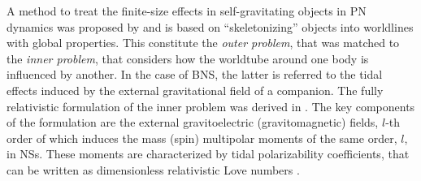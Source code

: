 A method to treat the finite-size effects in self-gravitating objects in \ac{PN} 
dynamics was proposed by \citet{Damour:1983a} and is based on ``skeletonizing'' 
objects into worldlines with global properties. This constitute the \textit{outer problem}, that was matched to the \textit{inner problem}, that considers how the worldtube 
around one body is influenced by another. In the case of \ac{BNS}, the latter is 
referred to the tidal effects induced by the external gravitational field of a companion. 
The fully relativistic formulation of the inner problem was derived in 
\citet{Hinderer:2007mb,Damour:2009vw,Binnington:2009bb}. 
%
%
The key components of the formulation are the external gravitoelectric 
(gravitomagnetic) fields, $l$-th order of which induces the mass (spin) multipolar moments 
of the same order, $l$, in \acp{NS}. These moments are characterized by %
tidal polarizability coefficients, that can be written as dimensionless relativistic 
Love numbers \citep{Damour:2009vw,Binnington:2009bb}.
%
